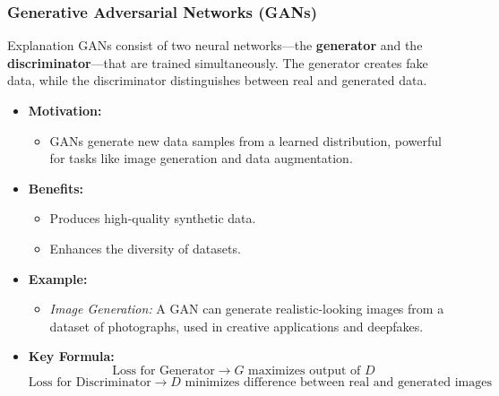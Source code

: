 \documentclass[aspectratio=169]{beamer}
\begin{document}
\begin{frame}[fragile]
    \frametitle{Generative Adversarial Networks (GANs)}
    \begin{block}{Explanation}
        GANs consist of two neural networks—the \textbf{generator} and the \textbf{discriminator}—that are trained simultaneously. The generator creates fake data, while the discriminator distinguishes between real and generated data.
    \end{block}
    
    \begin{itemize}
        \item \textbf{Motivation:}
        \begin{itemize}
            \item GANs generate new data samples from a learned distribution, powerful for tasks like image generation and data augmentation.
        \end{itemize}

        \item \textbf{Benefits:}
        \begin{itemize}
            \item Produces high-quality synthetic data.
            \item Enhances the diversity of datasets.
        \end{itemize}

        \item \textbf{Example:}
        \begin{itemize}
            \item \textit{Image Generation:} A GAN can generate realistic-looking images from a dataset of photographs, used in creative applications and deepfakes.
        \end{itemize}

        \item \textbf{Key Formula:}
        \begin{equation}
        \text{Loss for Generator} \rightarrow G \text{ maximizes output of } D
        \end{equation}
        \begin{equation}
        \text{Loss for Discriminator} \rightarrow D \text{ minimizes difference between real and generated images}
        \end{equation}
    \end{itemize}
\end{frame}
\end{document}
